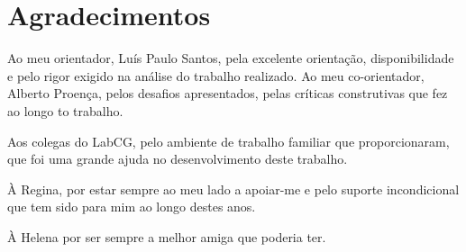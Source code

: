 \documentclass[
  oneside,
  11pt, a4paper,
  footinclude=true,
  headinclude=true,
  cleardoublepage=empty
]{scrbook}
\author{César Morais Perdigão}
\date{\myear} %
\begin{document}
	
    









	
\rm
	\cleardoublepage
	\setcounter{page}{0}

\chapter*{Agradecimentos}

Ao meu orientador, Luís Paulo Santos, pela excelente orientação, disponibilidade e pelo rigor exigido na análise do trabalho realizado.
Ao meu co-orientador, Alberto Proença, pelos desafios apresentados, pelas críticas construtivas que fez ao longo to trabalho.

Aos colegas do LabCG, pelo ambiente de trabalho familiar que proporcionaram, que foi uma grande ajuda no desenvolvimento deste trabalho.

À Regina, por estar sempre ao meu lado a apoiar-me e pelo suporte incondicional que tem sido para mim ao longo destes anos.

À Helena por ser sempre a melhor amiga que poderia ter.
\end{document}
